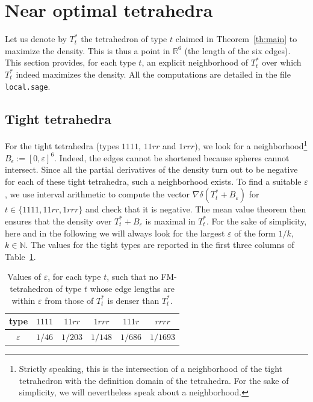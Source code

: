 \documentclass[11pt]{article}
\begin{document}


\section{Near optimal tetrahedra}
\label{sec:epsilon}

Let us denote by $T^*_t$ the tetrahedron of type $t$ claimed in Theorem~\ref{th:main} to maximize the density.
This is thus a point in $\mathbb{R}^6$ (the length of the six edges).
This section provides, for each type $t$, an explicit neighborhood of $T_t^*$ over which $T_t^*$ indeed maximizes the density.
All the computations are detailed in the file \verb+local.sage+.


\subsection{Tight tetrahedra}
\label{sec:tights}

For the tight tetrahedra (types $1111$, $11rr$ and $1rrr$), we look for a neighborhood\footnote{Strictly speaking, this is the intersection of a neighborhood of the tight tetrahedron with the definition domain of the tetrahedra. For the sake of simplicity, we will nevertheless speak about a neighborhood.} $B_\epsilon:=[0,\varepsilon]^6$.
Indeed, the edges cannot be shortened because spheres cannot intersect.
Since all the partial derivatives of the density turn out to be negative for each of these tight tetrahedra, such a neighborhood exists.
To find a suitable $\varepsilon$, we use interval arithmetic to compute the vector $\nabla\delta(T_t^*+B_\varepsilon)$ for $t\in\{1111,11rr,1rrr\}$ and check that it is negative.
The mean value theorem then ensures that the density over $T_t^*+B_\varepsilon$ is maximal in $T_t^*$.
For the sake of simplicity, here and in the following we will always look for the largest $\varepsilon$ of the form $1/k$, $k\in\mathbb{N}$.
The values for the tight types are reported in the first three columns of Table~\ref{tab:epsilon}.


\begin{table}[htbp]
\centering
\begin{tabular}{|c|c|c|c|c|c|}
\hline
type & $1111$ & $11rr$ & $1rrr$ & $111r$ & $rrrr$\\
\hline
$\varepsilon$ & $1/46$ & $1/203$ & $1/148$ & $1/686$ & $1/1693$\\
\hline
\end{tabular}
\caption{
Values of $\varepsilon$, for each type $t$, such that no FM-tetrahedron of type $t$ whose edge lengths are within $\varepsilon$ from those of $T_t^*$ is denser than $T_t^*$.
}
\label{tab:epsilon}
\end{table}
\end{document}
